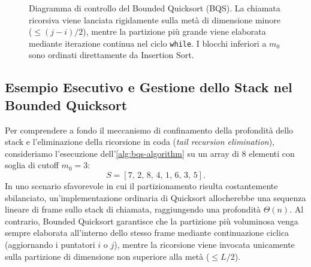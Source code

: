 \begin{figure}[H]
  \caption{Diagramma di controllo del Bounded Quicksort (BQS). La chiamata ricorsiva viene lanciata rigidamente sulla metà di dimensione minore ($\le (j-i)/2$), mentre la partizione più grande viene elaborata mediante iterazione continua nel ciclo \texttt{while}. I blocchi inferiori a $m_0$ sono ordinati direttamente da Insertion Sort.}
  \label{fig:bqs-control-flow}
\end{figure}

\FloatBarrier

\subsection{Esempio Esecutivo e Gestione dello Stack nel Bounded Quicksort}
\label{subsec:bqs-execution-example}

Per comprendere a fondo il meccanismo di confinamento della profondità dello stack e l'eliminazione della ricorsione in coda (\textit{tail recursion elimination}), consideriamo l'esecuzione dell'\autoref{alg:bqs-algorithm} su un array di 8 elementi con soglia di cutoff $m_0 = 3$:
\begin{equation}
  S = [7, \, 2, \, 8, \, 4, \, 1, \, 6, \, 3, \, 5].
\end{equation}
In uno scenario sfavorevole in cui il partizionamento risulta costantemente sbilanciato, un'implementazione ordinaria di Quicksort allocherebbe una sequenza lineare di frame sullo stack di chiamata, raggiungendo una profondità $\Theta(n)$. Al contrario, Bounded Quicksort garantisce che la partizione più voluminosa venga sempre elaborata all'interno dello stesso frame mediante continuazione ciclica (aggiornando i puntatori $i$ o $j$), mentre la ricorsione viene invocata unicamente sulla partizione di dimensione non superiore alla metà ($\le L/2$).


